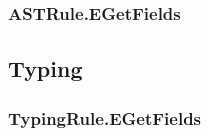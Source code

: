 \subsubsection{ASTRule.EGetFields}
\begin{mathpar}
\end{mathpar}

\subsection{Typing}
\subsubsection{TypingRule.EGetFields}
